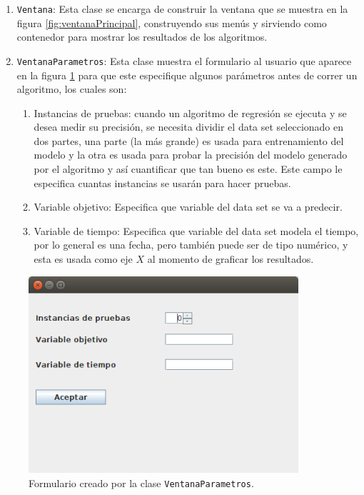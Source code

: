 \renewcommand{\labelenumi}{$\bullet$ }
\begin{enumerate}
	\item \texttt{Ventana}: Esta clase se encarga de construir la ventana que se muestra en la figura \ref{fig:ventanaPrincipal}, construyendo sus menús y sirviendo como contenedor para mostrar los resultados de los algoritmos.
	
	\item \texttt{VentanaParametros}: Esta clase muestra el formulario al usuario que aparece en la figura \ref{fig:VentanaParametros} para que este especifique algunos parámetros antes de correr un algoritmo, los cuales son:
	
	 \begin{enumerate}
	 	\item Instancias de pruebas: cuando un algoritmo de regresión se ejecuta y se desea medir su precisión, se necesita dividir el data set seleccionado en dos partes, una parte (la más grande) es usada para entrenamiento del modelo y la otra es usada para probar la precisión del modelo generado por el algoritmo y así cuantificar que tan bueno es este. Este campo le especifica cuantas instancias se usarán para hacer pruebas.

	 	\item Variable objetivo: Especifica que variable del data set se va a predecir.

	 	\item Variable de tiempo: Especifica que variable del data set modela el tiempo, por lo general es una fecha, pero también puede ser de tipo numérico, y esta es usada como eje $X$ al momento de graficar los resultados.
	 \end{enumerate} 

\end{enumerate}

\begin{figure}[ht]
	\centering
	\includegraphics[width=10cm]{img/VentanaParametros.png}
	\caption{Formulario creado por la clase \texttt{VentanaParametros}.}
	\label{fig:VentanaParametros}
\end{figure}

